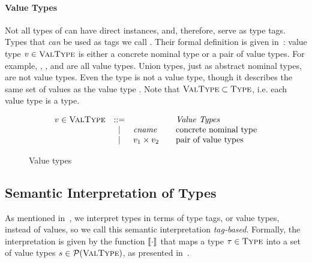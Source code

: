 \paragraph{Value Types}
Not all types of \BetaJulia can have direct instances, and, therefore,
serve as type tags. Types that \emph{can} be used as tags we call 
. 
Their formal definition is given in~:
value type $v \in \textsc{ValType}$ is either a concrete nominal type 
or a pair of value types. 
For example, \tyflt, \typair{\tyint}{\tyint},
and \typair{\tystr}{(\typair{\tyint}{\tyint})} are all value types.
Union types, just as abstract nominal types, are not value types.
Even the type \tyunion{\tyint}{\tyint} is not a value type, 
though it describes the same set of values as the value type \tyint.
Note that $\textsc{ValType} \subset \textsc{Type}$, i.e. each value type is a type.

\begin{figure}
	\[
	\begin{array}{rcl@{\qquad}l}
	\vty \in \VType & ::= & & \text{\emph{Value Types}}
	\\ &\Alt& \cname & \text{concrete nominal type}
	\\ &\Alt& \typair{\vty_1}{\vty_2} & \text{pair of value types}
	\end{array}
	\]
	\caption{Value types} %
	\label{fig:bjsem-value-types}
\end{figure}


\subsection{Semantic Interpretation of Types}

As mentioned in~, 
we interpret types in terms of type tags, or value types, instead of values,
so we call this semantic interpretation \emph{tag-based}.
Formally, the interpretation is given by the function
$\llbracket \cdot \rrbracket$ that maps a type $\tau \in \textsc{Type}$
into a set of value types $s \in \mathcal{P}(\textsc{ValType})$,
as presented in~.

